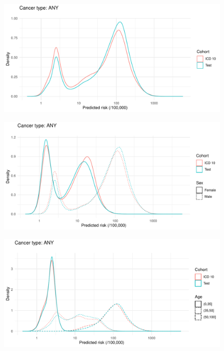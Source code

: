 \documentclass[english]{article}
\begin{document}
\begin{figure}[h]
\centering
\includegraphics[width=\linewidth]{icd10/score_dist_ANY.pdf}
\end{figure}
\begin{figure}[h]
\centering
\includegraphics[width=\linewidth]{icd10/score_dist_ANY_bysex.pdf}
\end{figure}
\begin{figure}[h]
\centering
\includegraphics[width=\linewidth]{icd10/score_dist_ANY_byage.pdf}
\end{figure}
\end{document}
